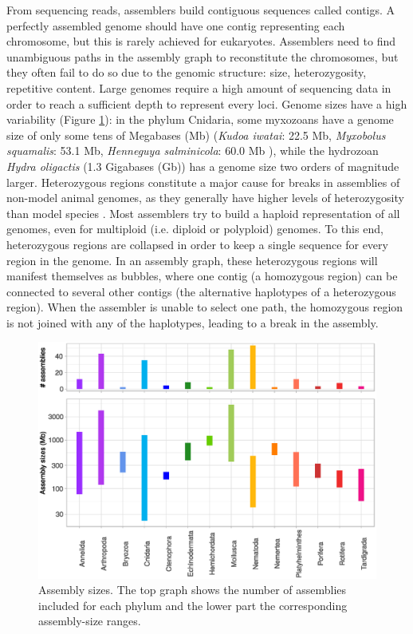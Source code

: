 From sequencing reads, assemblers build contiguous sequences called contigs. A perfectly assembled genome should have one contig representing each chromosome, but this is rarely achieved for eukaryotes. Assemblers need to find unambiguous paths in the assembly graph to reconstitute the chromosomes, but they often fail to do so due to the genomic structure: size, heterozygosity, repetitive content. Large genomes require a high amount of sequencing data in order to reach a sufficient depth to represent every loci. Genome sizes have a high variability (Figure \ref{fig:sizes}): in the phylum Cnidaria, some myxozoans have a genome size of only some tens of Megabases (Mb) (\textit{Kudoa iwatai}: 22.5 Mb, \textit{Myxobolus squamalis}: 53.1 Mb, \textit{Henneguya salminicola}: 60.0 Mb \cite{henneguya_salminicola}), while the hydrozoan \textit{Hydra oligactis} (1.3 Gigabases (Gb)) \cite{hydra_oligactis} has a genome size two orders of magnitude larger. Heterozygous regions constitute a major cause for breaks in assemblies of non-model animal genomes, as they generally have higher levels of heterozygosity than model species \cite{Leffler2012a}. Most assemblers try to build a haploid representation of all genomes, even for multiploid (i.e. diploid or polyploid) genomes. To this end, heterozygous regions are collapsed in order to keep a single sequence for every region in the genome. In an assembly graph, these heterozygous regions will manifest themselves as bubbles, where one contig (a homozygous region) can be connected to several other contigs (the alternative haplotypes of a heterozygous region). When the assembler is unable to select one path, the homozygous region is not joined with any of the haplotypes, leading to a break in the assembly. 

\begin{figure}
    \centering
    \includegraphics[width=\textwidth]{fig/review_assembly_sizes.eps}
    \caption{Assembly sizes. The top graph shows the number of assemblies included for each phylum and the lower part the corresponding assembly-size ranges.}
    \label{fig:sizes}
\end{figure}

